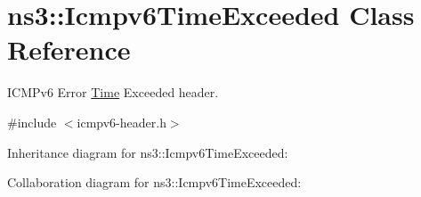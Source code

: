 \hypertarget{classns3_1_1Icmpv6TimeExceeded}{}\section{ns3\+:\+:Icmpv6\+Time\+Exceeded Class Reference}
\label{classns3_1_1Icmpv6TimeExceeded}


I\+C\+M\+Pv6 Error \hyperlink{classns3_1_1Time}{Time} Exceeded header.  




{\ttfamily \#include $<$icmpv6-\/header.\+h$>$}



Inheritance diagram for ns3\+:\+:Icmpv6\+Time\+Exceeded\+:


Collaboration diagram for ns3\+:\+:Icmpv6\+Time\+Exceeded\+:
